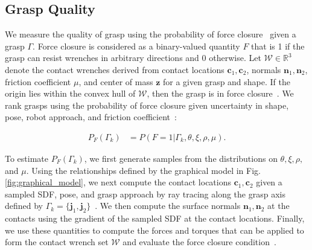 \documentclass[10pt, conference]{ieeeconf}      %
\newcommand{\bc}{\mathbf{c}}
\newcommand{\bj}{\mathbf{j}}
\newcommand{\bn}{\mathbf{n}}
\newcommand{\bz}{\mathbf{z}}
\newcommand{\mW}{\mathcal{W}}
\begin{document}
 
\subsection{Grasp Quality}\label{sec:grasp_sample}
We measure the quality of grasp using the probability of force closure~\cite{kehoe2012estimating, kehoe2012toward, kim2012physically,weisz2012pose} given a grasp $\Gamma$. Force closure is considered as a binary-valued quantity $F$ that is 1 if the grasp can resist wrenches in arbitrary directions and 0 otherwise.
Let $\mW \in \mathbb{R}^3$ denote the contact wrenches derived from contact locations $\bc_1,\bc_2$, normals $\bn_1,\bn_2$, friction coefficient $\mu$, and center of mass $\bz$ for a given grasp and shape.
If the origin lies within the convex hull of $\mW$, then the grasp is in force closure~\cite{li1988task}.
We rank grasps using the probability of force closure given uncertainty in shape, pose, robot approach, and friction coefficient~\cite{christopoulos2007handling, kehoe2012toward}:

\vspace{-2ex}
\begin{align*}
	P_F(\Gamma_k) &= P \left(F = 1 | \Gamma_k, \theta, \xi, \rho, \mu \right).
\end{align*}
 
To estimate $P_F(\Gamma_k)$, we first generate samples from the distributions on $\theta, \xi, \rho,$ and $\mu$.
Using the relationships defined by the graphical model in Fig. \ref{fig:graphical_model}, we next compute the contact locations $\bc_1, \bc_2$ given a sampled SDF, pose, and grasp approach by ray tracing along the grasp axis defined by $\Gamma_k = \lbrace \bj_1,\bj_2 \rbrace$~\cite{mahler2015gp}.
We then compute the surface normals $\bn_1, \bn_2$ at the contacts using the gradient of the sampled SDF at the contact locations.
Finally, we use these quantities to compute the forces and torques that can be applied to form the contact wrench set $\mW$ and evaluate the force closure condition~\cite{li1988task}.

%
%
% 
\end{document}
